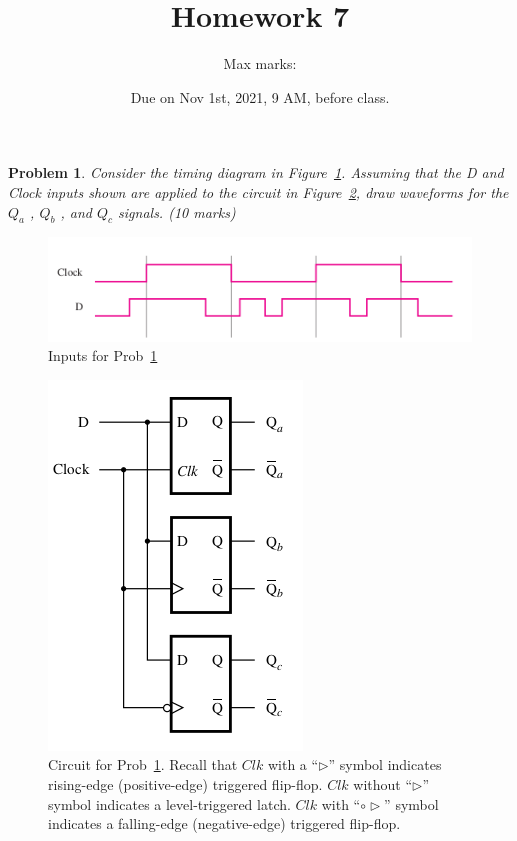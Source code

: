 \documentclass[twocolumn]{article}
\title{Homework 7}
\author{Max marks: }
\date{Due on Nov 1st, 2021, 9 AM, before class.}
\newtheorem{prob}{Problem}
\begin{document}
\maketitle
\begin{prob}
  Consider the timing diagram in Figure~\ref{fig:p51}. Assuming that the D and Clock inputs shown
  are applied to the circuit in Figure~\ref{fig:5.10}, draw waveforms for the
  $Q_a$ , $Q_b$ , and $Q_c$ signals. (10 marks)~\cite[Prob 5.1]{brown2013fundamentals}
  \label{prob:1}
\end{prob}
\begin{figure}[h]
  \includegraphics[width=\linewidth]{fig-p5.1.png}
  \caption{Inputs for Prob~\ref{prob:1}}
  \label{fig:p51}
\end{figure}
\begin{figure}[ht!]
  \includegraphics[width=0.7\linewidth]{fig-5.10.png}
  \caption{Circuit for Prob~\ref{prob:1}.
    Recall that $Clk$ with a ``$\triangleright$'' symbol
    indicates rising-edge (positive-edge) triggered flip-flop. $Clk$ without
    ``$\triangleright$'' symbol indicates a level-triggered latch.
    $Clk$ with ``$\circ\triangleright$'' symbol
    indicates a falling-edge (negative-edge) triggered flip-flop. 
  }
  \label{fig:5.10}
\end{figure}
\end{document}
